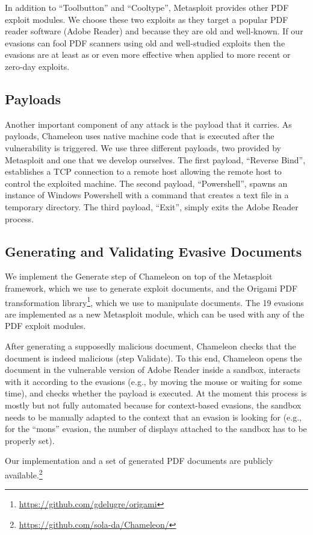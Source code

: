 In addition to ``Toolbutton'' and ``Cooltype'', Metasploit provides other PDF exploit modules.
We choose these two exploits as they target a popular PDF reader software (Adobe Reader) and because
they are old and well-known. If our evasions can fool PDF scanners using old and well-studied
exploits then the evasions are at least as or even more effective when applied to more recent
or zero-day exploits.

\subsection{Payloads}
\label{ss: payloads}

Another important component of any attack is the payload that it carries.
As payloads, Chameleon uses native machine code that is executed after the vulnerability is triggered.
We use three different payloads, two provided by Metasploit and one that we develop ourselves.
The first payload, ``Reverse Bind'', establishes a TCP connection to a remote host allowing the remote host to control the exploited machine.
The second payload, ``Powershell'', spawns an instance of Windows Powershell with a command that creates a text file in a temporary directory.
The third payload, ``Exit'', simply exits the Adobe Reader process.

\subsection{Generating and Validating Evasive Documents}

We implement the Generate step of Chameleon on top of the Metasploit framework, which we use to generate exploit documents, and the Origami PDF transformation library\footnote{\url{https://github.com/gdelugre/origami}}, which we use to manipulate documents.
The 19 evasions are implemented as a new Metasploit module, which can be used with any of the PDF exploit modules.

After generating a supposedly malicious document, Chameleon checks that the document is indeed malicious (step Validate).
To this end, Chameleon opens the document in the vulnerable version of Adobe Reader inside a sandbox, interacts with it according to the evasions (e.g., by moving the mouse or waiting for some time), and checks whether the payload is executed.
At the moment this process is mostly but not fully automated because for context-based evasions, the sandbox needs to be manually adapted to the context that an evasion is looking for (e.g., for the ``mons'' evasion, the number of displays attached to the sandbox has to be properly set).

Our implementation and a set of \nbSamplesSize{} generated PDF documents are publicly available.\footnote{\url{https://github.com/sola-da/Chameleon/}}

